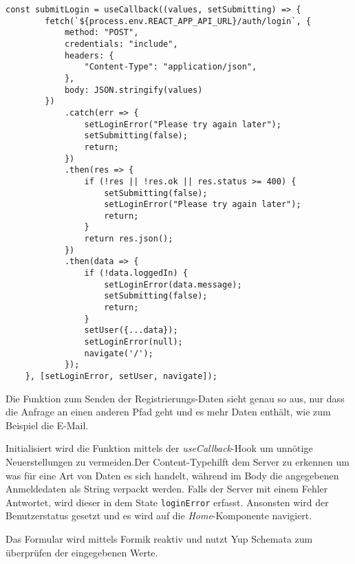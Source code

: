\begin{lstlisting}[style=codeStyle, caption={Die Funktion zum Senden der Benutzerdaten an das Backend}, label={lst:submitLogin}]
    const submitLogin = useCallback((values, setSubmitting) => {
        fetch(`${process.env.REACT_APP_API_URL}/auth/login`, {
            method: "POST",
            credentials: "include",
            headers: {
                "Content-Type": "application/json",
            },
            body: JSON.stringify(values)
        })
            .catch(err => {
                setLoginError("Please try again later");
                setSubmitting(false);
                return;
            })
            .then(res => {
                if (!res || !res.ok || res.status >= 400) {
                    setSubmitting(false);
                    setLoginError("Please try again later");
                    return;
                }
                return res.json();
            })
            .then(data => {
                if (!data.loggedIn) {
                    setLoginError(data.message);
                    setSubmitting(false);
                    return;
                }
                setUser({...data});
                setLoginError(null);
                navigate('/');
            });
    }, [setLoginError, setUser, navigate]);
\end{lstlisting}

Die Funktion zum Senden der Registrierungs-Daten sieht genau so aus, nur dass die Anfrage an einen anderen Pfad geht und es mehr Daten enthält, wie zum Beispiel die E-Mail.

Initialisiert wird die Funktion mittels der \textit{useCallback}-Hook um unnötige Neuerstellungen zu vermeiden.Der \glqq Content-Type\grqq{ }hilft dem Server zu erkennen um was für eine Art von Daten es sich handelt, während im Body die angegebenen Anmeldedaten als String verpackt werden. Falls der Server mit einem Fehler Antwortet, wird dieser in dem State \verb|loginError| erfasst. Ansonsten wird der Benutzerstatus gesetzt und es wird auf die \textit{Home}-Komponente navigiert.

Das Formular wird mittels Formik reaktiv und nutzt Yup Schemata zum überprüfen der eingegebenen Werte.

